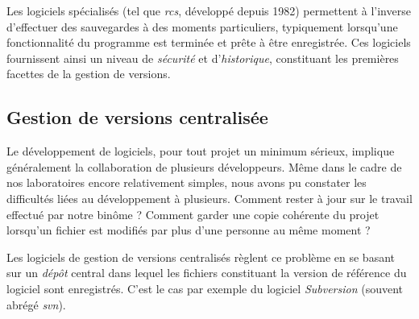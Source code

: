 \documentclass[11pt,a4paper]{article}
\begin{document}
%

Les logiciels spécialisés (tel que \textit{rcs}, développé depuis 1982) permettent à l'inverse d'effectuer des sauvegardes à des moments particuliers, typiquement lorsqu'une fonctionnalité du programme est terminée et prête à être enregistrée.
Ces logiciels fournissent ainsi un niveau de \textit{sécurité} et d'\textit{historique}, constituant les premières facettes de la gestion de versions.

\subsection{Gestion de versions centralisée}


Le développement de logiciels, pour tout projet un minimum sérieux, implique généralement la collaboration de plusieurs développeurs.
Même dans le cadre de nos laboratoires encore relativement simples, nous avons pu constater les difficultés liées au développement à plusieurs.
Comment rester à jour sur le travail effectué par notre binôme ?
Comment garder une copie cohérente du projet lorsqu'un fichier est modifiés par plus d'une personne au même moment ?

Les logiciels de gestion de versions centralisés règlent ce problème en se basant sur un \textit{dépôt} central dans lequel les fichiers constituant la version de référence du logiciel sont enregistrés.
C'est le cas par exemple du logiciel \textit{Subversion} (souvent abrégé \textit{svn}).

\end{document}
